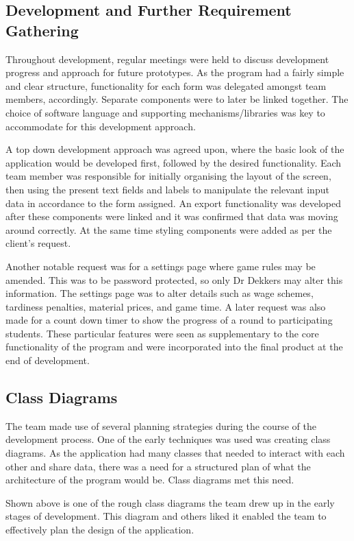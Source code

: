 \documentclass{l3proj}
\begin{document}
\subsection{Development and Further Requirement Gathering}
Throughout development, regular meetings were held to discuss development progress and approach for future prototypes. As the program had a fairly simple and clear structure, functionality for each form was delegated amongst team members, accordingly. Separate components were to later be linked together. The choice of software language and supporting mechanisms/libraries was key to accommodate for this development approach.

A top down development approach was agreed upon, where the basic look of the application would be developed first, followed by the desired functionality. Each team member was responsible for initially organising the layout of the screen, then using the present text fields and labels to manipulate the relevant input data in accordance to the form assigned. An export functionality was  developed after these components were linked and it was confirmed that data was moving around correctly. At the same time styling components were added as per the client's request.

Another notable request was for a settings page where game rules may be amended. This was to be password protected, so only Dr Dekkers may alter this information. The settings page was to alter details such as wage schemes, tardiness penalties, material prices, and game time. A later request was also made for a count down timer to show the progress of a round to participating students.  These particular features were seen as supplementary to the core functionality of the program  and were incorporated into the final product at the end of development.

\subsection{Class Diagrams}
The team made use of several planning strategies during the course of the development process. One of the early techniques was used was creating class diagrams. As the application had many classes that needed to interact with each other and share data, there was a need for a structured plan of what the architecture of the program would be. Class diagrams met this need.

Shown above is one of the rough class diagrams the team drew up in the early stages of development. This diagram and others liked it enabled the team to effectively plan the design of the application.
\end{document}
